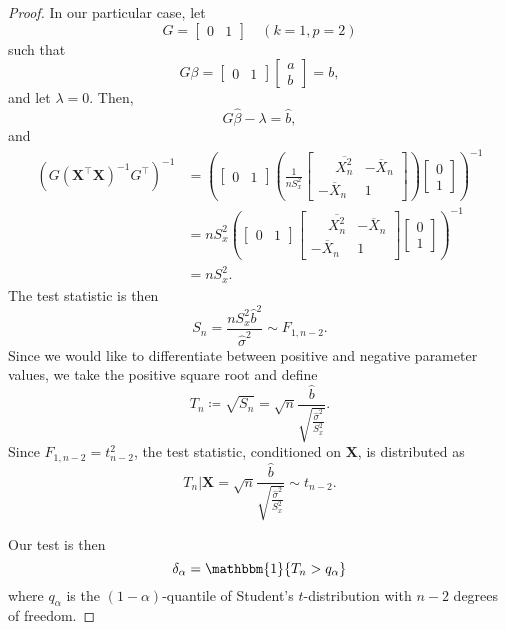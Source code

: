 \documentclass[letterpaper, reqno]{amsart}
\numberwithin{equation}{section}
\newcommand{\T}{\top} %
\newcommand{\vect}[1]{\boldsymbol{\mathbf{#1}}} %
\newcommand{\ddfrac}[2]{\frac{\displaystyle #1}{\displaystyle #2}}
\newcommand{\indic}[1]{\mathbbm{1}\mleft\{#1\mright\}} %
\newcommand{\Xnbar}{\overline{X}_n}
\newcommand{\Xsqbar}{\overline{X_n^2}}
\newcommand{\Xm}{\vect{X}}
\newcommand{\Bv}{\beta}
\newcommand{\Bvh}{\hat{\beta}}
\begin{document}
\begin{proof}
  In our particular case, let
  \[ G = \begin{bmatrix} 0 & 1 \end{bmatrix} \quad (k = 1, p = 2) \]
  such that
  \[ G\Bv = \begin{bmatrix} 0 & 1 \end{bmatrix} \begin{bmatrix} a \\ b \end{bmatrix} = b, \]
  and let $\lambda = 0$.
  Then, 
  \[ G\Bvh - \lambda = \hat{b}, \]
  and
  \begin{align*}
    (G (\Xm^\T \Xm)^{-1} G^\T)^{-1} &=
    \left(
    \begin{bmatrix} 0 & 1 \end{bmatrix}
    \left(
    \frac{1}{n S_x^2}
    \begin{bmatrix}
      \phantom{-}\Xsqbar  & -\Xnbar \\
      -\Xnbar              & 1
    \end{bmatrix}
    \right)
    \begin{bmatrix} 0 \\ 1 \end{bmatrix}
    \right)^{-1} \\
    &=
    n S_x^2
    \left(
    \begin{bmatrix} 0 & 1 \end{bmatrix}
    \begin{bmatrix}
      \phantom{-}\Xsqbar  & -\Xnbar \\
      -\Xnbar              & 1
    \end{bmatrix}
    \begin{bmatrix} 0 \\ 1 \end{bmatrix}
    \right)^{-1} \\
    &= n S_x^2.
  \end{align*}
  The test statistic is then
  \[ S_n = \frac{n S_x^2 \hat{b}^2}{\hat{\sigma}^2} \sim F_{1, n-2}. \]
  Since we would like to differentiate between positive and negative parameter
  values, we take the positive square root and define
  \[ T_n \coloneqq \sqrt{S_n} = \sqrt{n} \ddfrac{\hat{b}}{\sqrt{\frac{\hat{\sigma}^2}{S_x^2}}}. \]
  Since $F_{1, n-2} = t_{n-2}^2$, the test statistic, conditioned on $\Xm$, is
  distributed as
  \[ T_n | \Xm = \sqrt{n} \ddfrac{\hat{b}}{\sqrt{\frac{\hat{\sigma}^2}{S_x^2}}} 
    \sim t_{n-2}. \]

  Our test is then
  \[ \delta_\alpha = \indic{T_n > q_\alpha} \]
  where $q_\alpha$ is the $(1-\alpha)$-quantile of Student's $t$-distribution
  with $n-2$ degrees of freedom.
\end{proof}
\end{document}
